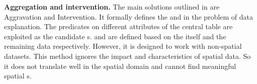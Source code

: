 
{\bf Aggregation and intervention.} 
The main solutions outlined in \cite{roy2014formal} are Aggravation and Intervention. 
It formally defines the {\fact} and {\explanation} in the problem of data explanation. 
The predicates on different attributes of the central table are exploited as the candidate {\explanation}s.
{\aggravation} and {\intervention} are defined based on the {\explanation} itself and the remaining data respectively. 
However, it is designed to work with non-spatial datasets. 
This method ignores the impact and characteristics of spatial data. 
So it does not translate well in the spatial domain and cannot find meaningful spatial {\explanation}s.

